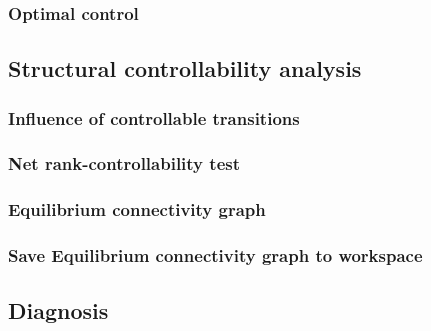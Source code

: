 \subsubsection{Optimal control}

\subsection{Structural controllability analysis}
\subsubsection{Influence of controllable transitions}
\subsubsection{Net rank-controllability test}
\subsubsection{Equilibrium connectivity graph}
\subsubsection{Save Equilibrium connectivity graph to workspace}
\subsection{Diagnosis}
